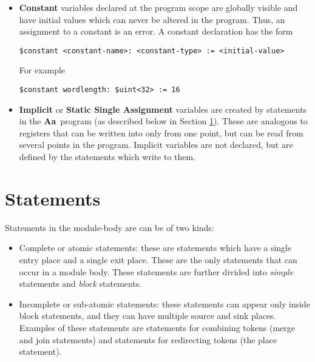 \documentclass{article}
\newcommand{\Aa}{{\bf Aa}~}
\begin{document}
\begin{itemize}
Pipe variable declarations can also be appended by
the following keywords:
\begin{verbatim}
   ($in | $out)? ($signal)? 
\end{verbatim}
These additional keywords mean the following things:
\begin{itemize}
\item Inclusion of ``\$in'' (respectively ``\$out'') means
that the pipe is a read-only (respectively write-only) object.
\item The ``\$signal'' keyword means that the pipe behaves
like a variable.  That is, it remembers the last value
that was written to it.    
\end{itemize}
\item {\bf Constant} variables declared at
the program scope are globally visible and have
initial values which can never be altered in the program.
Thus, an assignment to a constant is an error.
A constant declaration has the form
\begin{verbatim}
$constant <constant-name>: <constant-type> := <initial-value>
\end{verbatim}
For example
\begin{verbatim}
$constant wordlength: $uint<32> := 16
\end{verbatim}
\item {\bf Implicit} or {\bf Static Single Assignment}
variables are created by statements in the \Aa program
(as described below in Section \ref{sec:Statements}).
These are analogous to registers that can be written
into only from one point,  but can be
read from several points in the program.
Implicit variables are not declared, but are defined
by the statements which write to them.
\end{itemize} 


\section{Statements} \label{sec:Statements}
 
Statements in the module-body are can be of two kinds:
\begin{itemize}
\item Complete or atomic statements: these are statements
which have a single
entry place and a single exit place.  These are
the only statements that can occur in a module body.
These statements are further divided into 
{\em simple} statements and {\em block} statements.
\item Incomplete or sub-atomic statements:  these statements
can appear only inside block statements,  and they
can have multiple source and sink places.
Examples of these statements are statements for
combining tokens (merge and join statements) and
statements for redirecting tokens (the place statement).
\end{itemize}
\end{document}

